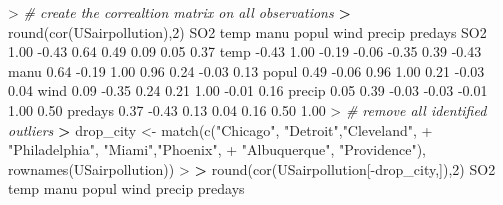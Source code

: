 \documentclass[
]{article}
\newenvironment{Shaded}{\begin{snugshade}}{\end{snugshade}}
\newcommand{\CommentTok}[1]{\textcolor[rgb]{0.56,0.35,0.01}{\textit{#1}}}
\newcommand{\DecValTok}[1]{\textcolor[rgb]{0.00,0.00,0.81}{#1}}
\newcommand{\ErrorTok}[1]{\textcolor[rgb]{0.64,0.00,0.00}{\textbf{#1}}}
\newcommand{\FloatTok}[1]{\textcolor[rgb]{0.00,0.00,0.81}{#1}}
\newcommand{\FunctionTok}[1]{\textcolor[rgb]{0.00,0.00,0.00}{#1}}
\newcommand{\NormalTok}[1]{#1}
\newcommand{\OtherTok}[1]{\textcolor[rgb]{0.56,0.35,0.01}{#1}}
\newcommand{\SpecialCharTok}[1]{\textcolor[rgb]{0.00,0.00,0.00}{#1}}
\newcommand{\StringTok}[1]{\textcolor[rgb]{0.31,0.60,0.02}{#1}}
\begin{document}
\begin{Shaded}
\begin{Highlighting}[]
\SpecialCharTok{\textgreater{}} \CommentTok{\# create the correaltion matrix on all observations}
\ErrorTok{\textgreater{}} \FunctionTok{round}\NormalTok{(}\FunctionTok{cor}\NormalTok{(USairpollution),}\DecValTok{2}\NormalTok{)}
\NormalTok{          SO2  temp  manu popul  wind precip predays}
\NormalTok{SO2      }\FloatTok{1.00} \SpecialCharTok{{-}}\FloatTok{0.43}  \FloatTok{0.64}  \FloatTok{0.49}  \FloatTok{0.09}   \FloatTok{0.05}    \FloatTok{0.37}
\NormalTok{temp    }\SpecialCharTok{{-}}\FloatTok{0.43}  \FloatTok{1.00} \SpecialCharTok{{-}}\FloatTok{0.19} \SpecialCharTok{{-}}\FloatTok{0.06} \SpecialCharTok{{-}}\FloatTok{0.35}   \FloatTok{0.39}   \SpecialCharTok{{-}}\FloatTok{0.43}
\NormalTok{manu     }\FloatTok{0.64} \SpecialCharTok{{-}}\FloatTok{0.19}  \FloatTok{1.00}  \FloatTok{0.96}  \FloatTok{0.24}  \SpecialCharTok{{-}}\FloatTok{0.03}    \FloatTok{0.13}
\NormalTok{popul    }\FloatTok{0.49} \SpecialCharTok{{-}}\FloatTok{0.06}  \FloatTok{0.96}  \FloatTok{1.00}  \FloatTok{0.21}  \SpecialCharTok{{-}}\FloatTok{0.03}    \FloatTok{0.04}
\NormalTok{wind     }\FloatTok{0.09} \SpecialCharTok{{-}}\FloatTok{0.35}  \FloatTok{0.24}  \FloatTok{0.21}  \FloatTok{1.00}  \SpecialCharTok{{-}}\FloatTok{0.01}    \FloatTok{0.16}
\NormalTok{precip   }\FloatTok{0.05}  \FloatTok{0.39} \SpecialCharTok{{-}}\FloatTok{0.03} \SpecialCharTok{{-}}\FloatTok{0.03} \SpecialCharTok{{-}}\FloatTok{0.01}   \FloatTok{1.00}    \FloatTok{0.50}
\NormalTok{predays  }\FloatTok{0.37} \SpecialCharTok{{-}}\FloatTok{0.43}  \FloatTok{0.13}  \FloatTok{0.04}  \FloatTok{0.16}   \FloatTok{0.50}    \FloatTok{1.00}
\SpecialCharTok{\textgreater{}} \CommentTok{\# remove all identified outliers}
\ErrorTok{\textgreater{}}\NormalTok{ drop\_city }\OtherTok{\textless{}{-}} \FunctionTok{match}\NormalTok{(}\FunctionTok{c}\NormalTok{(}\StringTok{"Chicago"}\NormalTok{, }\StringTok{"Detroit"}\NormalTok{,}\StringTok{"Cleveland"}\NormalTok{,}
\SpecialCharTok{+}                      \StringTok{"Philadelphia"}\NormalTok{, }\StringTok{"Miami"}\NormalTok{,}\StringTok{"Phoenix"}\NormalTok{,}
\SpecialCharTok{+}                      \StringTok{"Albuquerque"}\NormalTok{, }\StringTok{"Providence"}\NormalTok{), }\FunctionTok{rownames}\NormalTok{(USairpollution))}
\SpecialCharTok{\textgreater{}} 
\ErrorTok{\textgreater{}} \FunctionTok{round}\NormalTok{(}\FunctionTok{cor}\NormalTok{(USairpollution[}\SpecialCharTok{{-}}\NormalTok{drop\_city,]),}\DecValTok{2}\NormalTok{)}
\NormalTok{          SO2  temp  manu popul  wind precip predays}

\end{Highlighting}
\end{Shaded}
\end{document}
